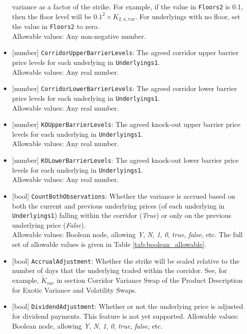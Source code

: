 \begin{itemize}
  variance as a factor of the strike. For example, if the value in \lstinline!Floors2! is 0.1, then the floor level will
  be $0.1^2 \times K_{2,u,\text{var}}$. For underlyings with no floor, set the value in \lstinline!Floors2! to zero. \\
  Allowable values: Any non-negative number.
  \item{}[number] \lstinline!CorridorUpperBarrierLevels!: The agreed corridor upper barrier price levels for each underlying
  in \lstinline!Underlyings1!. \\
  Allowable values: Any real number.
  \item{}[number] \lstinline!CorridorLowerBarrierLevels!: The agreed corridor lower barrier price levels for each underlying
  in \lstinline!Underlyings1!. \\
  Allowable values: Any real number.
  \item{}[number] \lstinline!KOUpperBarrierLevels!: The agreed knock-out upper barrier price levels for each underlying in
  \lstinline!Underlyings1!. \\
  Allowable values: Any real number.
  \item{}[number] \lstinline!KOLowerBarrierLevels!: The agreed knock-out lower barrier price levels for each underlying in
  \lstinline!Underlyings1!. \\
  Allowable values: Any real number.
  \item{}[bool] \lstinline!CountBothObservations!: Whether the variance is accrued based on both the current and
  previous underlying prices (of each underlying in \lstinline!Underlyings1!) falling within the corridor (\emph{True})
  or only on the previous underlying price (\emph{False}). \\
  Allowable values: Boolean node, allowing \emph{Y}, \emph{N}, \emph{1}, \emph{0}, \emph{true}, \emph{false}, etc.
  The full set of allowable values is given in Table \ref{tab:boolean_allowable}.
  \item{}[bool] \lstinline!AccrualAdjustment!: Whether the strike will be scaled relative to the number of days that the
  underlying traded within the corridor. See, for example, $\widetilde{K}_{var}$ in section Corridor Variance Swap
  of the Product Description for Exotic Variance and Volatility Swaps.
  \item{}[bool] \lstinline!DividendAdjustment!: Whether or not the underlying price is adjusted for dividend payments. This feature is
  not yet supported.
  Allowable values: Boolean node, allowing \emph{Y}, \emph{N}, \emph{1}, \emph{0}, \emph{true}, \emph{false}, etc.

\end{itemize}
